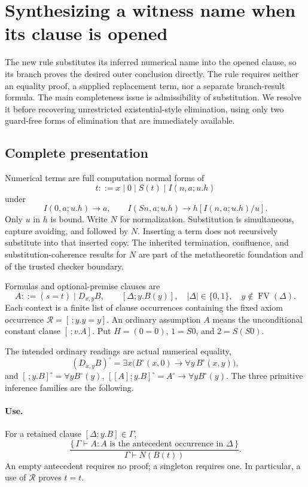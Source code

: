 \section{Synthesizing a witness name when its clause is opened}
\label{sec:named-opening}

The new rule substitutes its inferred numerical name into
the opened clause, so its branch proves the desired outer conclusion
directly. The rule requires neither an equality proof, a supplied
replacement term, nor a separate branch-result formula. The main
completeness issue is admissibility of substitution. We resolve it before
recovering unrestricted existential-style elimination, using only two
guard-free forms of elimination that are immediately available.

\subsection{Complete presentation}

Numerical terms are full computation normal forms of
\[
 t::=x\mid0\mid S(t)\mid I(n,a;u.h)
\]
under
\[
 I(0,a;u.h)\longrightarrow a,\qquad
 I(Sn,a;u.h)\longrightarrow h[I(n,a;u.h)/u].
\]
Only $u$ in $h$ is bound. Write $N$ for normalization. Substitution is
simultaneous, capture avoiding, and followed by $N$. Inserting a term
does not recursively substitute into that inserted copy. The inherited
termination, confluence, and substitution-coherence results for $N$ are
part of the metatheoretic foundation and of the trusted checker boundary.

Formulas and optional-premise clauses are
\[
 A::=(s=t)\mid D_{x,y}B,\qquad
 [\Delta;y.B(y)],\quad |\Delta|\in\{0,1\},
 \quad y\notin\operatorname{FV}(\Delta).
\]
Each context is a finite list of clause occurrences containing the fixed
axiom occurrence $\mathcal R=[\,;y.y=y]$. An ordinary assumption $A$
means the unconditional constant clause $[\,;v.A]$. Put $H=(0=0)$,
$1=S0$, and $2=S(S0)$.

The intended ordinary readings are actual numerical equality,
\[
 (D_{x,y}B)^\circ=\exists x\bigl(B^\circ(x,0)\to
                                      \forall y\,B^\circ(x,y)\bigr),
\]
and $[\,;y.B]^\circ=\forall y B^\circ(y)$,
$[[A];y.B]^\circ=A^\circ\to\forall y B^\circ(y)$.
The three primitive inference families are the following.

\paragraph{Use.}
For a retained clause $[\Delta;y.B]\in\Gamma$,
\[
 \frac{\{\,\Gamma\vdash A:A\text{ is the antecedent occurrence in }
                                  \Delta\,\}}
      {\Gamma\vdash N(B(t))}.
 \tag{U}
\]
An empty antecedent requires no proof; a singleton requires one.
In particular, a use of $\mathcal R$ proves $t=t$.

